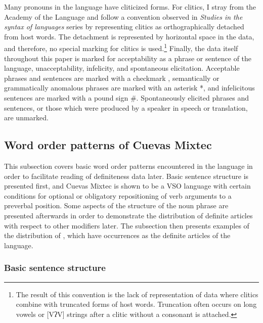 \documentclass[output=paper,modfonts,nonflat]{langsci/langscibook}
\begin{document}
Many pronouns in the language have cliticized forms.  For clitics, I stray from the Academy of the  Language and follow a convention observed in\linebreak {} \textit{Studies in the syntax of  languages} series by representing clitics as orthographically detached from host words.  The detachment is represented by horizontal space in the data, and therefore, no special marking for clitics is used.\footnote{The result of this convention is the lack of representation of data where clitics combine with truncated forms of host words.  Truncation often occurs on long vowels or [VʔV] strings after a clitic without a consonant is attached.}  Finally, the data itself throughout this paper is marked for acceptability as a phrase or sentence of the language, unacceptability, infelicity, and spontaneous elicitation.  Acceptable phrases and sentences are marked with a checkmark \checkmark, semantically or grammatically anomalous phrases are marked with an asterisk *, and infelicitous sentences are marked with a pound sign \#.  Spontaneously elicited phrases and sentences, or those which were produced by a speaker in speech or translation, are unmarked.

\subsection{Word order patterns of Cuevas Mixtec} \label{sec:cisneros:3.3}

This subsection covers basic word order patterns encountered in the language in order to facilitate reading of definiteness data later.  Basic sentence structure is presented first, and Cuevas Mixtec is shown to be a VSO language with certain conditions for optional or obligatory repositioning of verb arguments to a preverbal position.  Some aspects of the structure of the noun phrase are presented afterwards in order to demonstrate the distribution of definite articles with respect to other modifiers later.  The subsection then presents examples of the distribution of , which have occurrences as the definite articles of the language.

\subsubsection{Basic sentence structure} \label{sec:cisneros:3.3.1}
\end{document}
